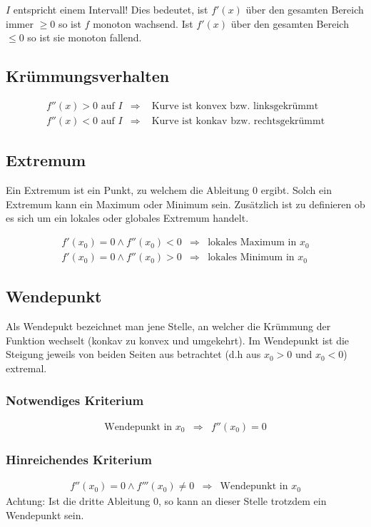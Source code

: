\noindent
$I$ entspricht einem Intervall! Dies bedeutet, ist $f'(x)$ über den gesamten 
Bereich immer $\geq 0$ so ist $f$ monoton wachsend. Ist $f'(x)$ über den 
gesamten Bereich $\leq 0$ so ist sie monoton fallend.

\subsection{Krümmungsverhalten}

\[ \boxed{ \begin{matrix}
f''(x) > 0 \text{ auf } I & \Rightarrow  
& \text{ Kurve ist konvex bzw. linksgekrümmt} \\
f''(x) < 0 \text{ auf } I & \Rightarrow  
& \text{ Kurve ist konkav bzw. rechtsgekrümmt}
\end{matrix} } \]

\subsection{Extremum}
Ein Extremum ist ein Punkt, zu welchem die Ableitung $0$ ergibt.
Solch ein Extremum kann ein Maximum oder Minimum sein.
Zusätzlich ist zu definieren ob es sich um ein lokales oder globales Extremum 
handelt.

\[ \boxed{ \begin{matrix}
f'(x_0) = 0 \land f''(x_0) < 0 & \Rightarrow & \text{lokales Maximum in $x_0$}\\
f'(x_0) = 0 \land f''(x_0) > 0 & \Rightarrow & \text{lokales Minimum in $x_0$} 
\end{matrix} } \]

\subsection{Wendepunkt}
Als Wendepukt bezeichnet man jene Stelle, an welcher die Krümmung der Funktion 
wechselt (konkav zu konvex und umgekehrt).
Im Wendepunkt ist die Steigung jeweils von beiden Seiten aus betrachtet 
(d.h aus $x_0 > 0$ und $x_0<0$) extremal.

\subsubsection{Notwendiges Kriterium}
\[ \boxed{ \begin{matrix}
\text{Wendepunkt in $x_0$} & \Rightarrow & f''(x_0) = 0
\end{matrix} } \]

\subsubsection{Hinreichendes Kriterium}
\[ \boxed{ \begin{matrix}
f''(x_0) = 0 \land f'''(x_0) \neq 0 & \Rightarrow & \text{Wendepunkt in $x_0$}
\end{matrix} } \]
Achtung: Ist die dritte Ableitung 0, so kann an dieser Stelle trotzdem ein 
Wendepunkt sein. 

